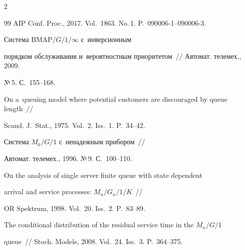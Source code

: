 \begin{multicols}{2}
{{\begin{thebibliography}{99}
AIP Conf. Proc., 2017. Vol.~1863. No.\,1. P.~090006-1--090006-3.







 Система $\mathrm{BMAP}/G/1/\infty$ с~инверсионным 


порядком обслуживания и~вероятностным приоритетом~// Автомат. телемех., 2009. 


№\,5. С.~155--168.












 On a~queuing model where potential customers are discouraged by queue length~//


Scand. J.~Stat., 1975. Vol.~2. Iss.~1. P.~34--42.
















 Система ${M_k/G/1}$ с~ненадежным прибором~//


Автомат. телемех., 1996. №\,9. С.~100--110.

















On the analysis of single server finite queue with state dependent


arrival and service processes: ${M_n/G_n/1/K}$~//


OR Spektrum, 1998. Vol.~20. Iss.~2. P.~83--89.







 The conditional distribution of the residual service time in the ${M_n/G/1}$ 


queue~// Stoch. Models, 2008. Vol.~24. Iss.~3. P.~364--375.






\end{thebibliography}}}
\end{multicols}
